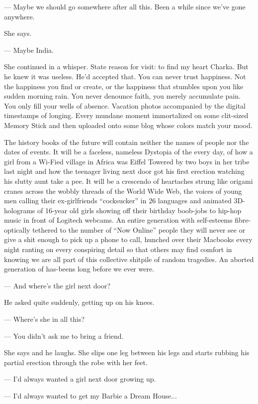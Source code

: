 \documentclass[11pt]{article}
\begin{document}
	--- Maybe we should go somewhere after all this. Been a while since we've 
gone anywhere. 

	She says.

	--- Maybe India.
	
	She continued in a whisper. State reason for visit: to find my heart 
Charka. But he knew it was useless. He'd accepted that. You can never trust 
happiness. Not the happiness you find or create, or the happiness that stumbles 
upon you like sudden morning rain. You never denounce faith, you merely 
accumulate pain. You only fill your wells of absence. Vacation photos 
accompanied by the digital timestamps of longing. Every mundane moment 
immortalized on some clit-sized Memory Stick and then uploaded onto some blog 
whose colors match your mood. 

	The history books of the future will contain neither the names of people 
nor the dates of events. It will be a faceless, nameless Dystopia of the every 
day, of how a girl from a Wi-Fied village in Africa was Eiffel Towered by two 
boys in her tribe last night and how the teenager living next door got his 
first erection watching his slutty aunt take a pee. It will be a crescendo of 
heartaches strung like origami cranes across the wobbly threads of the World 
Wide Web, the voices of young men calling their ex-girlfriends ``cocksucker'' in 
26 languages and animated 3D-holograms of 16-year old girls showing off their 
birthday boob-jobs to hip-hop music in front of Logitech webcams. An entire 
generation with self-esteems fibre-optically tethered to the number of ``Now 
Online'' people they will never see or give a shit enough to pick up a phone to 
call, hunched over their Macbooks every night ranting on every conspiring 
detail so that others may find comfort in knowing we are all part of this 
collective shitpile of random tragedies. An aborted generation of has-beens 
long before we ever were.

	--- And where's the girl next door?

	He asked quite suddenly, getting up on his knees. 

	--- Where's she in all this?

	--- You didn't ask me to bring a friend.

	She says and he laughs. She slips one leg between his legs and starts 
rubbing his partial erection through the robe with her feet.

	--- I'd always wanted a girl next door growing up.

	--- I'd always wanted to get my Barbie a Dream House...
\end{document}

